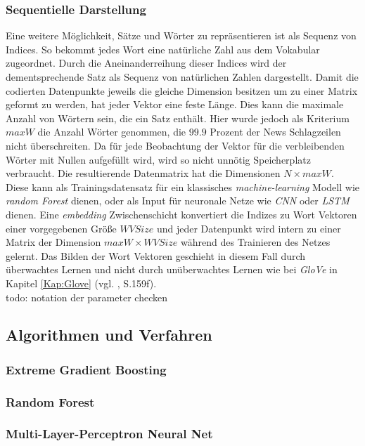 \documentclass[a4paper,11pt]{article}
\begin{document}
\subsubsection{Sequentielle Darstellung} \label{Kap:Seq}

Eine weitere Möglichkeit, Sätze und Wörter zu repräsentieren ist als Sequenz von Indices. So bekommt jedes Wort eine natürliche Zahl aus dem Vokabular zugeordnet. Durch die Aneinanderreihung dieser Indices wird der dementsprechende Satz als Sequenz von natürlichen Zahlen dargestellt. Damit die codierten Datenpunkte jeweils die gleiche Dimension besitzen um zu einer Matrix geformt zu werden, hat jeder Vektor eine feste Länge. Dies kann die maximale Anzahl von Wörtern sein, die ein Satz enthält. Hier wurde jedoch als Kriterium $maxW$ die Anzahl Wörter genommen, die $99.9$ Prozent der News Schlagzeilen nicht überschreiten.
Da für jede Beobachtung der Vektor für die verbleibenden Wörter mit Nullen aufgefüllt wird, wird so nicht unnötig Speicherplatz verbraucht. Die resultierende Datenmatrix hat die Dimensionen $N \times maxW$. Diese kann als Trainingsdatensatz für ein klassisches \textit{machine-learning} Modell wie \textit{random Forest} dienen, oder als Input für neuronale Netze wie \textit{CNN} oder \textit{LSTM} dienen. Eine \textit{embedding} Zwischenschicht konvertiert die Indizes zu Wort Vektoren einer vorgegebenen Größe $WVSize$ und jeder Datenpunkt wird intern zu einer Matrix der Dimension $maxW \times WVSize$ während des Trainieren des Netzes gelernt. Das Bilden der Wort Vektoren geschieht in diesem Fall durch überwachtes Lernen und nicht durch unüberwachtes Lernen wie bei \textit{GloVe} in Kapitel \ref{Kap:Glove} (vgl. \cite{keras}, S.159f).\\

todo: notation der parameter checken


\subsection{Algorithmen und Verfahren}

\subsubsection{Extreme Gradient Boosting}
\subsubsection{Random Forest}
\subsubsection{Multi-Layer-Perceptron Neural Net}
\end{document}
